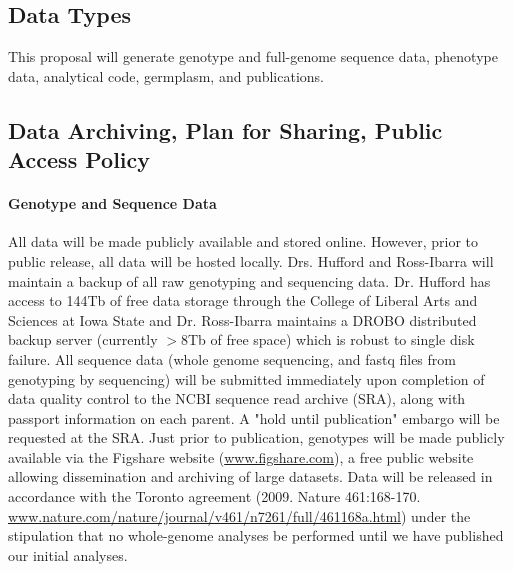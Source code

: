 %

\subsection*{Data Types} 

This proposal will generate genotype and full-genome sequence data, phenotype data, analytical code, germplasm, and publications.

\subsection*{Data Archiving, Plan for Sharing, Public Access Policy}

\paragraph{Genotype and Sequence Data} 
All data will be made publicly available and stored online.  However, prior to public release, all data will be hosted locally.  Drs. Hufford and Ross-Ibarra will maintain a backup of all raw genotyping and sequencing data.  Dr. Hufford has access to 144Tb of free data storage through the College of Liberal Arts and Sciences at Iowa State and Dr. Ross-Ibarra maintains a DROBO distributed backup server (currently $>8$Tb of free space) which is robust to single disk failure. All sequence data (whole genome sequencing, and fastq files from genotyping by sequencing) will be submitted immediately upon completion of data quality control to the NCBI sequence read archive (SRA), along with passport information on each parent. A "hold until publication" embargo will be requested at the SRA. Just prior to publication, genotypes will be made publicly available via the Figshare website (\url{www.figshare.com}), a free public website allowing dissemination and archiving of large datasets. Data will be released in accordance with the Toronto agreement (2009. Nature 461:168-170. \url{www.nature.com/nature/journal/v461/n7261/full/461168a.html}) under the stipulation that no whole-genome analyses be performed until we have published our initial analyses.

